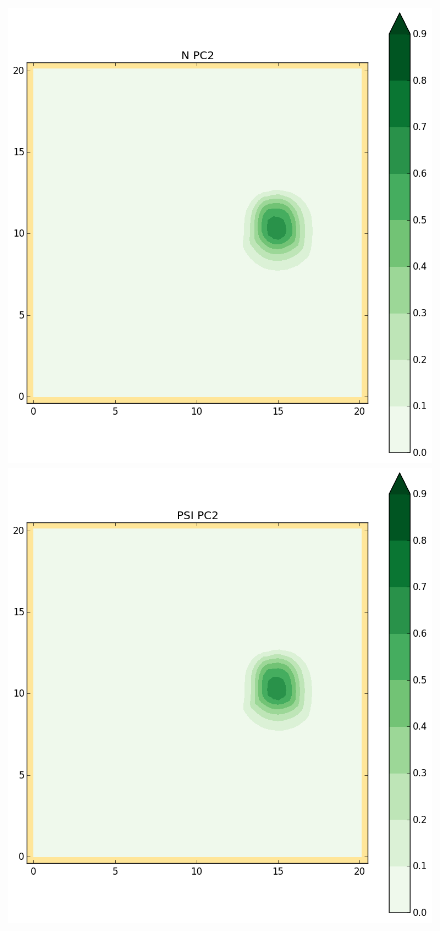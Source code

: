 \begin{figure}[h!]
\begin{minipage}[t]{0.50\textwidth}
 \centering
 \includegraphics[trim=19mm 19mm 35mm 21mm,clip,scale=0.28]{../img/figure_PC_N2.png}
\end{minipage}%
\begin{minipage}[t]{0.50\textwidth}
 \centering
 \includegraphics[trim=19mm 19mm 35mm 21mm,clip,scale=0.28]{../img/figure_PC_PSI2.png}

\end{minipage}
\end{figure}

